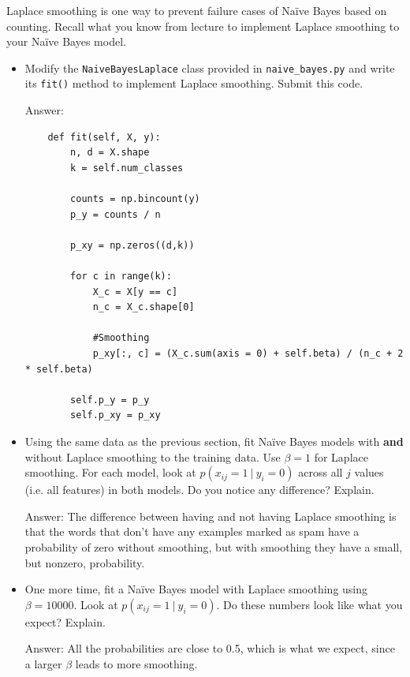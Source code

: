 \documentclass{article}
\newcommand{\blu}[1]{{\textcolor{blu}{#1}}}
\newenvironment{answer}{\par\begingroup\color{gre}Answer: }{\endgroup}
\let\ask\blu
\begin{document}
    Laplace smoothing is one way to prevent failure cases of Na\"ive Bayes based on counting. Recall what you know from lecture to implement Laplace smoothing to your Na\"ive Bayes model.
    \begin{itemize}
        \item Modify the \texttt{NaiveBayesLaplace} class provided in \texttt{naive\_bayes.py} and write its \texttt{fit()} method to implement Laplace smoothing. \ask{Submit this code.}

        \begin{answer}
            \begin{lstlisting}
    def fit(self, X, y):
        n, d = X.shape
        k = self.num_classes

        counts = np.bincount(y)
        p_y = counts / n

        p_xy = np.zeros((d,k))

        for c in range(k):
            X_c = X[y == c]
            n_c = X_c.shape[0]

            #Smoothing
            p_xy[:, c] = (X_c.sum(axis = 0) + self.beta) / (n_c + 2 * self.beta) 

        self.p_y = p_y
        self.p_xy = p_xy
\end{lstlisting}
        \end{answer}

        \item Using the same data as the previous section, fit Na\"ive Bayes models with \textbf{and} without Laplace smoothing to the training data. Use $\beta=1$ for Laplace smoothing. For each model, look at $p(x_{ij} = 1 \ | \ y_i = 0)$ across all $j$ values (i.e. all features) in both models. \ask{Do you notice any difference? Explain.}
        \begin{answer}
            The difference between having and not having Laplace smoothing is that the words that don't have any examples marked as spam have a probability of zero without smoothing, but with smoothing they have a small, but nonzero, probability.
        \end{answer}
        \item One more time, fit a Na\"ive Bayes model with Laplace smoothing using $\beta=10000$. Look at $p(x_{ij} = 1 \ | \ y_i = 0)$. \ask{Do these numbers look like what you expect? Explain.}
        \begin{answer}
            All the probabilities are close to 0.5, which is what we expect, since a larger $\beta$ leads to more smoothing.
        \end{answer}
    \end{itemize}
\end{document}
